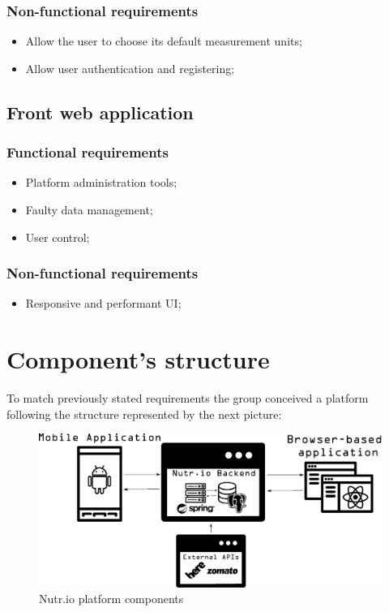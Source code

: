 \subsubsection{Non-functional requirements}

\begin{itemize}
    \item Allow the user to choose its default measurement units;
    \item Allow user authentication and registering;
\end{itemize}

\subsection{Front web application}

\subsubsection{Functional requirements}

\begin{itemize}
    \item Platform administration tools;
    \item Faulty data management;
    \item User control;
\end{itemize}

\subsubsection{Non-functional requirements}

\begin{itemize}
    \item Responsive and performant UI;
\end{itemize}

\section{Component's structure}

To match previously stated requirements the group conceived a platform following the structure
represented by the next picture:\\

\begin{figure}[H]
    \begin{center}
        \includegraphics[scale=0.4]{_figures/Nutrio_components.eps}
        \caption{Nutr.io platform components}
    \end{center}
\end{figure}


